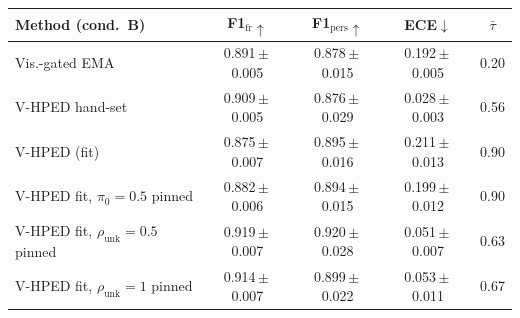 \begin{tabular}{@{}lcccc@{}}
\toprule
Method (cond.\ B) & F1$_{\mathrm{fr}}\uparrow$ & F1$_{\mathrm{pers}}\uparrow$ & ECE$\downarrow$ & $\bar\tau$ \\
\midrule
Vis.-gated EMA & 0.891\,$\pm$\,0.005 & 0.878\,$\pm$\,0.015 & 0.192\,$\pm$\,0.005 & 0.20 \\
V-HPED hand-set & 0.909\,$\pm$\,0.005 & 0.876\,$\pm$\,0.029 & 0.028\,$\pm$\,0.003 & 0.56 \\
V-HPED (fit) & 0.875\,$\pm$\,0.007 & 0.895\,$\pm$\,0.016 & 0.211\,$\pm$\,0.013 & 0.90 \\
V-HPED fit, $\pi_0{=}0.5$ pinned & 0.882\,$\pm$\,0.006 & 0.894\,$\pm$\,0.015 & 0.199\,$\pm$\,0.012 & 0.90 \\
V-HPED fit, $\rho_{\mathrm{unk}}{=}0.5$ pinned & 0.919\,$\pm$\,0.007 & 0.920\,$\pm$\,0.028 & 0.051\,$\pm$\,0.007 & 0.63 \\
V-HPED fit, $\rho_{\mathrm{unk}}{=}1$ pinned & 0.914\,$\pm$\,0.007 & 0.899\,$\pm$\,0.022 & 0.053\,$\pm$\,0.011 & 0.67 \\
\bottomrule
\end{tabular}
